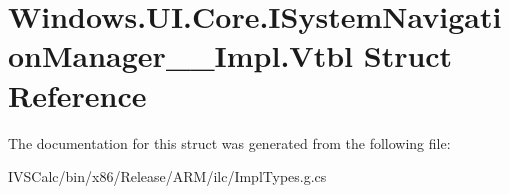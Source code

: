 \hypertarget{struct_windows_1_1_u_i_1_1_core_1_1_i_system_navigation_manager_____impl_1_1_vtbl}{}\section{Windows.\+U\+I.\+Core.\+I\+System\+Navigation\+Manager\+\_\+\+\_\+\+Impl.\+Vtbl Struct Reference}
\label{struct_windows_1_1_u_i_1_1_core_1_1_i_system_navigation_manager_____impl_1_1_vtbl}


The documentation for this struct was generated from the following file\+:\begin{DoxyCompactItemize}
\item 
I\+V\+S\+Calc/bin/x86/\+Release/\+A\+R\+M/ilc/Impl\+Types.\+g.\+cs\end{DoxyCompactItemize}
